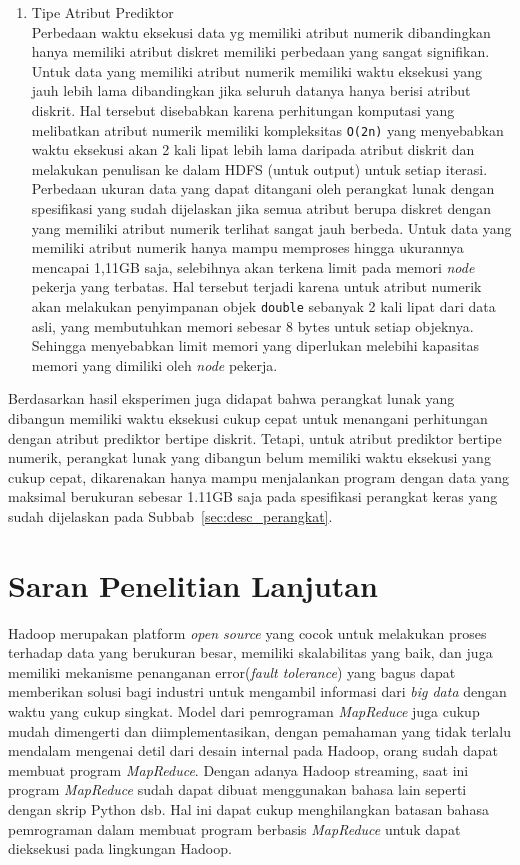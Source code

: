 \begin{itemize}
\begin{enumerate}[label=(\alph*)]
		\item Tipe Atribut Prediktor\\
		Perbedaan waktu eksekusi data yg memiliki atribut numerik dibandingkan hanya memiliki atribut diskret memiliki perbedaan yang sangat signifikan. Untuk data yang memiliki atribut numerik memiliki waktu eksekusi yang jauh lebih lama dibandingkan jika seluruh datanya hanya berisi atribut diskrit. Hal tersebut disebabkan karena perhitungan komputasi yang melibatkan atribut numerik memiliki kompleksitas \verb|O(2n)| yang menyebabkan waktu eksekusi akan 2 kali lipat lebih lama daripada atribut diskrit dan melakukan penulisan ke dalam HDFS (untuk output) untuk setiap iterasi.%
		Perbedaan ukuran data yang dapat ditangani oleh perangkat lunak dengan spesifikasi yang sudah dijelaskan jika semua atribut berupa diskret dengan yang memiliki atribut numerik terlihat sangat jauh berbeda. Untuk data yang memiliki atribut numerik hanya mampu memproses hingga ukurannya mencapai 1,11GB saja, selebihnya akan terkena limit pada memori \textit{node} pekerja yang terbatas. Hal tersebut terjadi karena untuk atribut numerik akan melakukan penyimpanan objek \texttt{double} sebanyak 2 kali lipat dari data asli, yang membutuhkan memori sebesar 8 bytes untuk setiap objeknya. Sehingga menyebabkan limit memori yang diperlukan melebihi kapasitas memori yang dimiliki oleh \textit{node} pekerja.
	\end{enumerate}

	Berdasarkan hasil eksperimen juga didapat bahwa perangkat lunak yang dibangun memiliki waktu eksekusi cukup cepat untuk menangani perhitungan dengan atribut prediktor bertipe diskrit. Tetapi, untuk atribut prediktor bertipe numerik, perangkat lunak yang dibangun belum memiliki waktu eksekusi yang cukup cepat, dikarenakan hanya mampu menjalankan program dengan data yang maksimal berukuran sebesar 1.11GB saja pada spesifikasi perangkat keras yang sudah dijelaskan pada Subbab~\ref{sec:desc_perangkat}.
	
\end{itemize}

\section{Saran Penelitian Lanjutan}

Hadoop merupakan platform \textit{open source} yang cocok untuk melakukan proses terhadap data yang berukuran besar, memiliki skalabilitas yang baik, dan juga memiliki mekanisme penanganan error(\textit{fault tolerance}) yang bagus dapat memberikan solusi bagi industri untuk mengambil informasi dari \textit{big data} dengan waktu yang cukup singkat. Model dari pemrograman \textit{MapReduce} juga cukup mudah dimengerti dan diimplementasikan, dengan pemahaman yang tidak terlalu mendalam mengenai detil dari desain internal pada Hadoop, orang sudah dapat membuat program \textit{MapReduce}. Dengan adanya Hadoop streaming, saat ini program \textit{MapReduce} sudah dapat dibuat menggunakan bahasa lain seperti dengan skrip Python dsb. Hal ini dapat cukup menghilangkan batasan bahasa pemrograman dalam membuat program berbasis \textit{MapReduce} untuk dapat dieksekusi pada lingkungan Hadoop.

